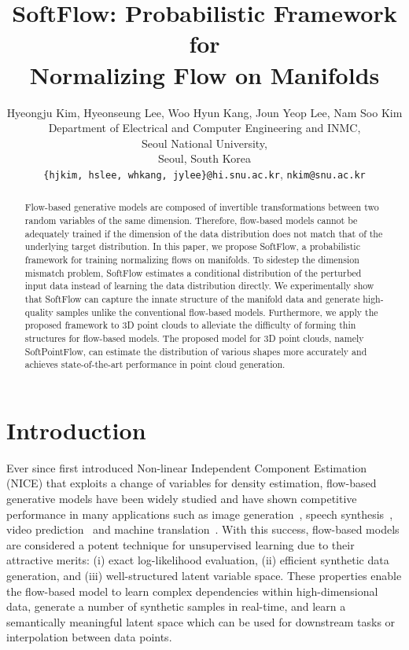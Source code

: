 \documentclass{article}
\title{SoftFlow: Probabilistic Framework for\\Normalizing Flow on Manifolds}
\author{Hyeongju Kim, Hyeonseung Lee, Woo Hyun Kang, Joun Yeop Lee, Nam Soo Kim \\
  Department of Electrical and Computer Engineering and INMC,\\
  Seoul National University,\\
  Seoul, South Korea \\
  \texttt{\{hjkim, hslee, whkang, jylee\}@hi.snu.ac.kr}, \texttt{nkim@snu.ac.kr}
}
\begin{document}
\maketitle

\begin{abstract}
 Flow-based generative models are composed of invertible transformations between two random variables of the same dimension. Therefore, flow-based models cannot be adequately trained if the dimension of the data distribution does not match that of the underlying target distribution. In this paper, we propose SoftFlow, a probabilistic framework for training normalizing flows on manifolds. To sidestep the dimension mismatch problem, SoftFlow estimates a conditional distribution of the perturbed input data instead of learning the data distribution directly. We experimentally show that SoftFlow can capture the innate structure of the manifold data and generate high-quality samples unlike the conventional flow-based models. Furthermore, we apply the proposed framework to 3D point clouds to alleviate the difficulty of forming thin structures for flow-based models. The proposed model for 3D point clouds, namely SoftPointFlow, can estimate the distribution of various shapes more accurately and achieves state-of-the-art performance in point cloud generation.
\end{abstract}


\section{Introduction}
Ever since \citet{dinh2014nice} first introduced Non-linear Independent Component Estimation (NICE) that exploits a change of variables for density estimation, flow-based generative models have been widely studied and have shown competitive performance in many applications such as image generation~\citep{kingma2018glow}, speech synthesis~\citep{prenger2019waveglow,kim2018flowavenet}, video prediction~\citep{kumar2019videoflow} and machine translation~\citep{ma2019flowseq}. With this success, flow-based models are considered a potent technique for unsupervised learning due to their attractive merits: (i) exact log-likelihood evaluation, (ii) efficient synthetic data generation, and (iii) well-structured latent variable space. These properties enable the flow-based model to learn complex dependencies within high-dimensional data, generate a number of synthetic samples in real-time, and learn a semantically meaningful latent space which can be used for downstream tasks or interpolation between data points.
\end{document}
